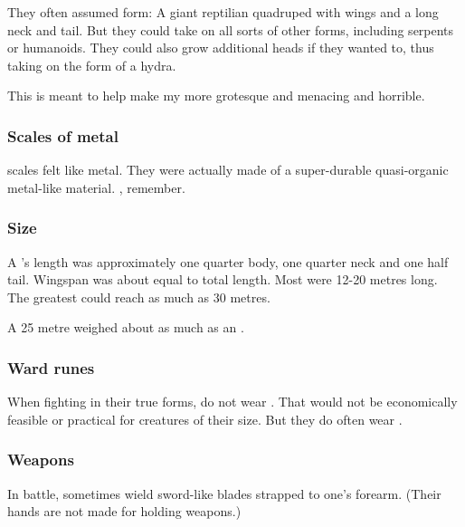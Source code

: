 They often assumed  \draconian form: 
A giant reptilian quadruped with wings and a long neck and tail. 
But they could take on all sorts of other forms, including serpents or humanoids. 
They could also grow additional heads if they wanted to, thus taking on the form of a hydra. 

This is meant to help make my \dragons more grotesque and menacing and horrible. 





\subsubsection{Scales of metal}
\Draconic scales felt like metal. 
They were actually made of a super-durable quasi-organic metal-like material.
, remember. 





\subsubsection{Size}
A \dragon's length was approximately one quarter body, one quarter neck and one half tail.
Wingspan was about equal to total length.
Most \dragons were 12-20 metres long. 
The greatest \dragons could reach as much as 30 metres. 

A 25 metre \dragon weighed about as much as an . 





\subsubsection{Ward runes}
When fighting in their true forms, \dragons{} do not wear \armour. 
That would not be economically feasible or practical for creatures of their size. 
But they do often wear . 





\subsubsection{Weapons}
\index{\skekrathuin}
In battle, \dragons{} sometimes wield \skekrathuins{}\dash sword-like blades strapped to one's forearm. 
(Their hands are not made for holding weapons.)

